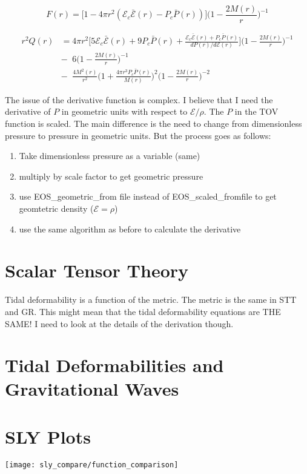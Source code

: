 \documentclass[11pt]{article}
\numberwithin{equation}{section}
\begin{document}
\begin{equation} 
F(r) = \bigg[ 1- 4 \pi r^{2} (\mathcal{E}_{c}\bar{\mathcal{E}}(r)-P_{c}\bar{P}(r))  \bigg] \bigg( 1-\frac{2 M(r) }{r}  \bigg)^{-1}
\end{equation}

\begin{align} 
r^{2} Q(r) &= 4 \pi r^{2} \bigg[ 5 \mathcal{E}_{c}\bar{\mathcal{E}}(r)+ 9 P_{c}\bar{P}(r) + \frac{\mathcal{E}_{c}\bar{\mathcal{E}}(r) + P_{c}\bar{P}(r)}{dP(r)/d\mathcal{E}(r)}   \bigg] \bigg(  1 - \frac{2 M(r)}{r} \bigg) ^{-1} \\
& - \;\; 6 \bigg( 1- \frac{2 M(r) }{r }  \bigg)^{-1} \nonumber \\	
& - \;\; \frac{4 M^{2}(r)}{r^{2}} \bigg( 1 + \frac{4 \pi r^3 P_{c} \bar{P}(r)}{M(r)}  \bigg)^{2} \bigg( 1 - \frac{2 M(r)}{r} \bigg)^{-2} \nonumber
\end{align}

The issue of the derivative function is complex.  I believe that I need the derivative of $P$ in geometric units with respect to $\mathcal{E}/\rho$.  The $P$ in the TOV function is scaled. 
The main difference is the need to change from dimensionless pressure to pressure in geometric units.  But the process goes as follows:

\begin{enumerate}
\item Take dimensionless pressure as a variable (same)
\item multiply by scale factor to get geometric pressure
\item use EOS\_geometric\_from file instead of EOS\_scaled\_fromfile to get geomtetric density ($\mathcal{E} = \rho$)
\item use the same algorithm as before to calculate the derivative
\end{enumerate}

\section{Scalar Tensor Theory}

Tidal deformability is a function of the metric.  The metric is the same in STT and GR.  This might mean that the tidal deformability equations are THE SAME!  I need to look at the details of the derivation though.

\section{Tidal Deformabilities and Gravitational Waves}

\clearpage

\section{SLY Plots}

\texttt{[image: sly\_compare/function\_comparison]} \\



\end{document}
